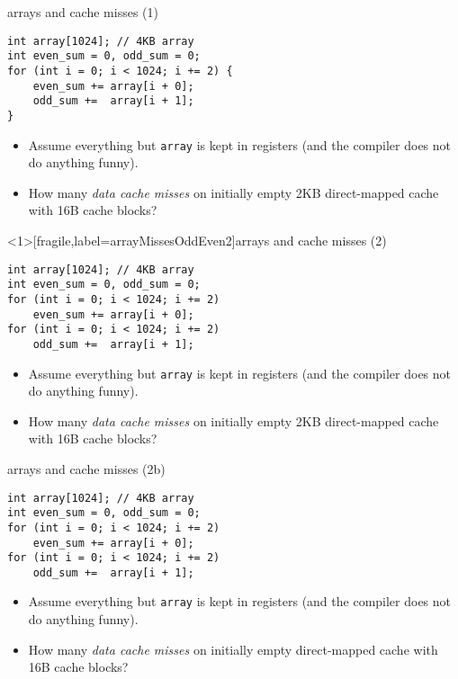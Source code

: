 \begin{frame}[fragile,label=arrayMissesOddEven1]{arrays and cache misses (1)}
\begin{lstlisting}
int array[1024]; // 4KB array
int even_sum = 0, odd_sum = 0;
for (int i = 0; i < 1024; i += 2) {
    even_sum += array[i + 0];
    odd_sum +=  array[i + 1];
}
\end{lstlisting}
    \begin{itemize}
        \item {\small
Assume everything but {\tt array} is kept in registers (and the compiler does not do
            anything funny).}
\item
How many \textit{data cache misses} on initially empty 2KB direct-mapped cache with 16B cache blocks?
    \end{itemize}
\end{frame}

\begin{frame}<1>[fragile,label=arrayMissesOddEven2]{arrays and cache misses (2)}
\begin{lstlisting}
int array[1024]; // 4KB array
int even_sum = 0, odd_sum = 0;
for (int i = 0; i < 1024; i += 2)
    even_sum += array[i + 0];
for (int i = 0; i < 1024; i += 2)
    odd_sum +=  array[i + 1];
\end{lstlisting}
    \begin{itemize}
        \item {\small
    Assume everything but {\tt array} is kept in registers (and the compiler does not do
    anything funny).
        }
    \item
How many \textit{data cache misses} on initially empty 2KB direct-mapped cache with 16B cache blocks?
    \end{itemize}
\end{frame}

\begin{frame}[fragile,label=arrayMissesOddEven3]{arrays and cache misses (2b)}
\begin{lstlisting}
int array[1024]; // 4KB array
int even_sum = 0, odd_sum = 0;
for (int i = 0; i < 1024; i += 2)
    even_sum += array[i + 0];
for (int i = 0; i < 1024; i += 2)
    odd_sum +=  array[i + 1];
\end{lstlisting}
    \begin{itemize}
        \item {\small
    Assume everything but {\tt array} is kept in registers (and the compiler does not do
    anything funny).
        }
    \item
        How many \textit{data cache misses} on initially empty  direct-mapped cache with 16B cache blocks?
    \end{itemize}
\end{frame}

